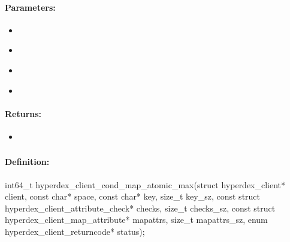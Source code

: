\paragraph{Parameters:}
\begin{itemize}[noitemsep]
\item {}\\

\item {}\\

\item {}\\

\item {}\\

\end{itemize}

\paragraph{Returns:}
\begin{itemize}[noitemsep]
\item {}\\

\end{itemize}

\pagebreak
\subsubsection{}
\label{api:c:cond_map_atomic_max}


\paragraph{Definition:}
\begin{ccode}
int64_t hyperdex_client_cond_map_atomic_max(struct hyperdex_client* client,
        const char* space,
        const char* key, size_t key_sz,
        const struct hyperdex_client_attribute_check* checks, size_t checks_sz,
        const struct hyperdex_client_map_attribute* mapattrs, size_t mapattrs_sz,
        enum hyperdex_client_returncode* status);
\end{ccode}

